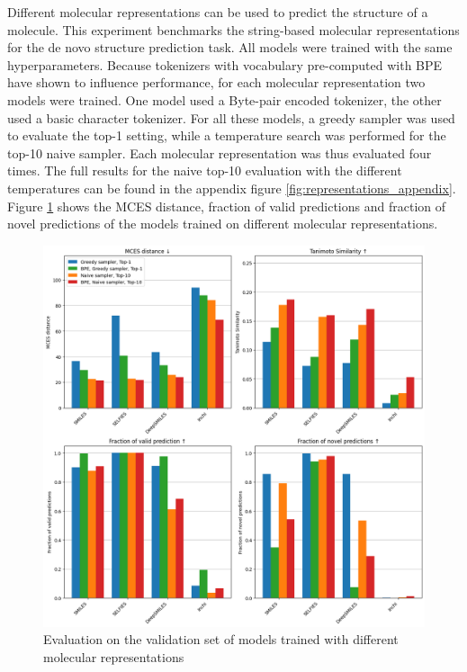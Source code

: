 Different molecular representations can be used to predict the structure of a molecule.
This experiment benchmarks the string-based molecular representations for the de novo structure prediction task.
All models were trained with the same hyperparameters.
Because tokenizers with vocabulary pre-computed with \ac{BPE} have shown to influence performance, for each molecular representation two models were trained.
One model used a Byte-pair encoded tokenizer, the other used a basic character tokenizer.
For all these models, a greedy sampler was used to evaluate the top-1 setting, while a temperature search was performed for the top-10 naive sampler.
Each molecular representation was thus evaluated four times.
The full results for the naive top-10 evaluation with the different temperatures can be found in the appendix figure \ref{fig:representations_appendix}.
Figure \ref{fig:representations} shows the MCES distance, fraction of valid predictions and fraction of novel predictions of the models trained on different molecular representations.

\begin{figure}[h]
    \centering
    \includegraphics[width=1.0\textwidth]{figures/results/representations_with_tanimoto.png}
    \caption{Evaluation on the validation set of models trained with different molecular representations}
    \label{fig:representations}
\end{figure}

